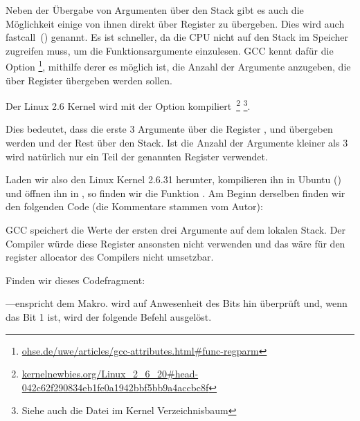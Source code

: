 \newcommand{\URLREGPARM}{\href{http://go.yurichev.com/17040}{ohse.de/uwe/articles/gcc-attributes.html\#func-regparm}}

\label{regparm}
Neben der Übergabe von Argumenten über den Stack gibt es auch die Möglichkeit
einige von ihnen direkt über Register zu übergeben. Dies wird auch
fastcall~() genannt. 
Es ist schneller, da die CPU nicht auf den Stack im Speicher zugreifen muss, um
die Funktionsargumente einzulesen.
GCC kennt dafür die Option \footnote{\URLREGPARM}, mithilfe derer es
möglich ist, die Anzahl der Argumente anzugeben, die über Register übergeben
werden sollen.

\newcommand{\URLKERNELNEWB}{\href{http://go.yurichev.com/17066}{kernelnewbies.org/Linux\_2\_6\_20\#head-042c62f290834eb1fe0a1942bbf5bb9a4accbc8f}}
\newcommand{\CALLINGHFILE}{arch/x86/include/asm/calling.h}

Der Linux 2.6 Kernel wird mit der Option 
kompiliert~\footnote{\URLKERNELNEWB} \footnote{Siehe auch die \TT{\CALLINGHFILE}
Datei im Kernel Verzeichnisbaum}.

Dies bedeutet, dass die erste 3 Argumente über die Register \EAX, \EDX und \ECX
übergeben werden und der Rest über den Stack. Ist die Anzahl der Argumente
kleiner als 3 wird natürlich nur ein Teil der genannten Register verwendet.

Laden wir also den Linux Kernel 2.6.31 herunter, kompilieren ihn in Ubuntu
() und öffnen ihn in \IDA, so finden wir die Funktion
. Am Beginn derselben finden wir den folgenden Code (die
Kommentare stammen vom Autor):


GCC speichert die Werte der ersten drei Argumente auf dem lokalen Stack.
Der Compiler würde diese Register ansonsten nicht verwenden und das wäre für den
\gls{register allocator} des Compilers nicht umsetzbar.

Finden wir dieses Codefragment:



---enspricht dem  Makro.
 wird auf Anwesenheit des  Bits hin überprüft und, wenn
das Bit 1 ist, wird der folgende \JNZ Befehl ausgelöst.

